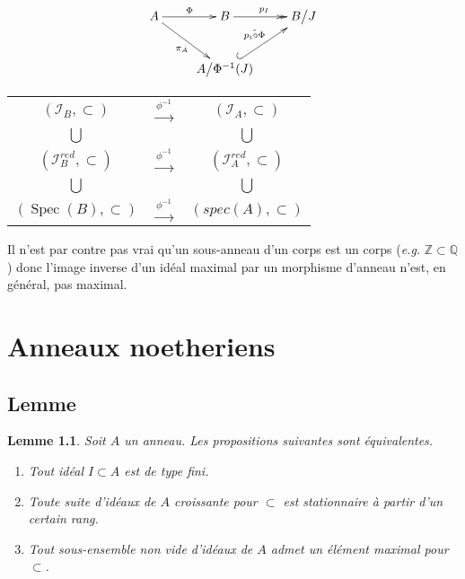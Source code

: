 \documentclass[a4paper, oneside, 12pt]{book}
\theoremstyle{theoremeStyle} %
\newtheorem{lemme}[theoreme]{Lemme}
\theoremstyle{definition} %
\DeclareMathOperator{\Spec}{Spec}
\newcommand{\Q}{\mathbb{Q}}
\newcommand{\Z}{\mathbb{Z}}
\begin{document}
$$ \xymatrix{A \ar[r]^\Phi \ar[rd]_{\pi_A} & B \ar@{->>}[r]^{p_I} & B\big/ J \\ & A\big/\Phi^{-1}(J) \ar@{^{(}->}[ru]^{\tilde{p_i \circ\Phi}} & } $$

\begin{center}
\begin{tabular}[t]{ccc}
    $(\mathcal{I}_B,\subset)$&$\stackrel{ \phi^{-1}}{\rightarrow}$&$ (\mathcal{I}_A,\subset)$\\
    $\displaystyle{\bigcup}$ &&$\displaystyle{\bigcup}$\\
    $(\mathcal{I}_B^{red},\subset)$&$\stackrel{ \phi^{-1}}{\rightarrow}$&$ (\mathcal{I}_A^{red},\subset)$\\
    $\displaystyle{\bigcup}$ &&$\displaystyle{\bigcup}$\\
    $(\Spec(B),\subset)$&$\stackrel{ \phi^{-1}}{\rightarrow}$&$ (spec(A),\subset)$\\
\end{tabular}
\end{center}
Il n'est par contre pas vrai qu'un sous-anneau d'un corps est un corps (\textit{e.g.} $\Z\subset \Q$) donc l'image inverse d'un idéal maximal par un morphisme d'anneau n'est, en général, pas maximal.
 
\chapter{Anneaux noetheriens}\label{AnneauNoetherien}
\section{Lemme}\label{NoethDef}

\begin{lemme}\label{NoethDef}
  Soit $A$ un anneau. Les propositions suivantes sont équivalentes.
  \begin{enumerate}[leftmargin=* ,parsep=0cm,itemsep=0cm,topsep=0cm]
  \item  Tout idéal $I\subset A$ est de type fini.
  \item  Toute suite  d'idéaux de $A$ croissante pour $\subset$ est stationnaire à partir d'un certain rang.
  \item Tout sous-ensemble non vide d'idéaux de $A$ admet un élément maximal pour $\subset $.
  \end{enumerate}
\end{lemme}
   
\end{document}
